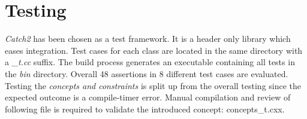 \section{Testing}

\emph{Catch2}\autocite{Catch} has been chosen as a test framework. It is a header only library which eases integration. Test cases for each class are located in the same directory with a \emph{\_t.cc} suffix. The build process generates an executable containing all tests in the \emph{bin} directory. Overall 48 assertions in 8 different test cases are evaluated. 
Testing the \emph{concepts and constraints} is split up from the overall testing since the expected outcome is a compile-timer error. Manual compilation and review of following file is required to validate the introduced concept: concepts\_t.cxx.
